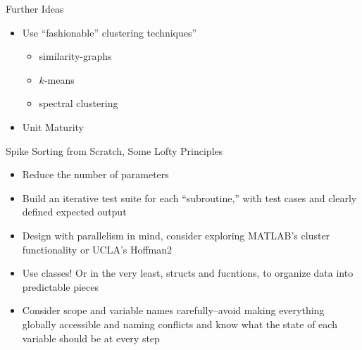 \documentclass{beamer}
\begin{document}
    \begin{frame}{Further Ideas}
    \begin{itemize}
        \pause
        \item Use ``fashionable'' clustering techniques''
        \begin{itemize}
            \item similarity-graphs
            \item \ensuremath{k}-means
            \item spectral clustering
        \end{itemize}
        \pause
        \item Unit Maturity
    \end{itemize}
    \end{frame}
        
    \begin{frame}{Spike Sorting from Scratch, Some Lofty Principles}
        \begin{itemize}
            \pause
            \item Reduce the number of parameters
            \pause
            \item Build an iterative test suite for each ``subroutine,'' with
test cases and clearly defined expected output
            \pause
            \item Design with parallelism in mind, consider exploring MATLAB's
cluster functionality or UCLA's Hoffman2
            \pause
            \item  Use classes! Or in the very least, structs and fucntions, to organize data
into predictable pieces
            \pause
            \item Consider scope and variable names carefully--avoid making
everything globally accessible and naming conflicts and know what the state of
each variable should be at every step
        \end{itemize}
    \end{frame}
\end{document}
